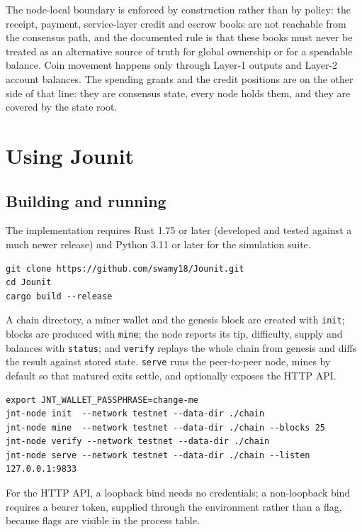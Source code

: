 \documentclass{article}
\begin{document}
The node-local boundary is enforced by construction rather than by policy: the
receipt, payment, service-layer credit and escrow books are not reachable from
the consensus path, and the documented rule is that these books must never be
treated as an alternative source of truth for global ownership or for a
spendable balance. Coin movement happens only through Layer-1 outputs and
Layer-2 account balances. The spending grants and the credit positions are on
the other side of that line: they are consensus state, every node holds them,
and they are covered by the state root.


\section{Using Jounit}
\label{sec:usage}

\subsection{Building and running}

The implementation requires Rust 1.75 or later (developed and tested against a
much newer release) and Python 3.11 or later for the simulation suite.

\begin{verbatim}
git clone https://github.com/swamy18/Jounit.git
cd Jounit
cargo build --release
\end{verbatim}

A chain directory, a miner wallet and the genesis block are created with
\texttt{init}; blocks are produced with \texttt{mine}; the node reports its tip,
difficulty, supply and balances with \texttt{status}; and \texttt{verify}
replays the whole chain from genesis and diffs the result against stored state.
\texttt{serve} runs the peer-to-peer node, mines by default so that matured
exits settle, and optionally exposes the HTTP API.

\begin{verbatim}
export JNT_WALLET_PASSPHRASE=change-me
jnt-node init  --network testnet --data-dir ./chain
jnt-node mine  --network testnet --data-dir ./chain --blocks 25
jnt-node verify --network testnet --data-dir ./chain
jnt-node serve --network testnet --data-dir ./chain --listen 127.0.0.1:9833
\end{verbatim}

For the HTTP API, a loopback bind needs no credentials; a non-loopback bind
requires a bearer token, supplied through the environment rather than a flag,
because flags are visible in the process table.
\end{document}
